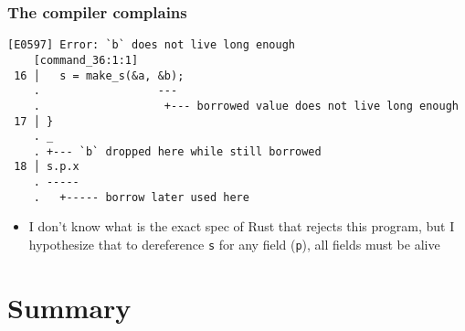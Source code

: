 \documentclass[12pt,dvipdfmx]{beamer}
\newcommand{\ao}[1]{{\color{blue}#1}}
\newcommand{\aka}[1]{{\color{red}#1}}
\begin{document}
\begin{frame}[fragile]
  \frametitle{The compiler complains}
    \begin{lstlisting}
[E0597] Error: `b` does not live long enough
    [command_36:1:1]
 16 │   s = make_s(&a, &b);
    .                  ---
    .                   +--- borrowed value does not live long enough
 17 │ }
    . _
    . +--- `b` dropped here while still borrowed
 18 │ s.p.x
    . -----
    .   +----- borrow later used here
  \end{lstlisting}
  \begin{itemize}
  \item I don't know what is the exact spec of Rust that
  rejects this program, but I hypothesize that to dereference
  {\tt s} for any field ({\tt p}), all fields must be alive
  \end{itemize}
\end{frame}

\iffalse
\begin{frame}[fragile]
  \frametitle{Note}
  \begin{itemize}
\item if it was
\begin{lstlisting}
fn make_s(@\ao{\tt a: \&T}@, @\aka{\tt b: \&T}@) -> S { S{p: @\aka{\tt b}@, q: @\ao{\tt a}@} }
\end{lstlisting}
then a valid lifetime specification becomes
\begin{lstlisting}
fn make_s(@\ao{\tt a: \&'a T}@, @\aka{\tt b: \&'b T}@) -> @{\tt S<\aka{'b}, \ao{'a}>}@ {
  S{p: @\aka{\tt b}@, q: @\ao{\tt a}@}
}    
\end{lstlisting}
\end{itemize}
\end{frame}
\fi


\section{Summary}
\end{document}
